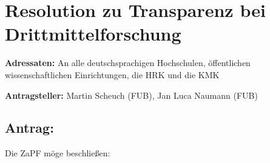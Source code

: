 \documentclass[DIV=9]{scrartcl}
\begin{document}
\section*{Resolution zu Transparenz bei Drittmittelforschung}

\textbf{Adressaten:} An alle deutschsprachigen Hochschulen, öffentlichen wissenschaftlichen Einrichtungen, die HRK und die KMK

\textbf{Antragsteller:} Martin Scheuch (FUB), Jan Luca Naumann (FUB)

\subsection*{Antrag:}
Die ZaPF möge beschließen:\\\\
\end{document}

